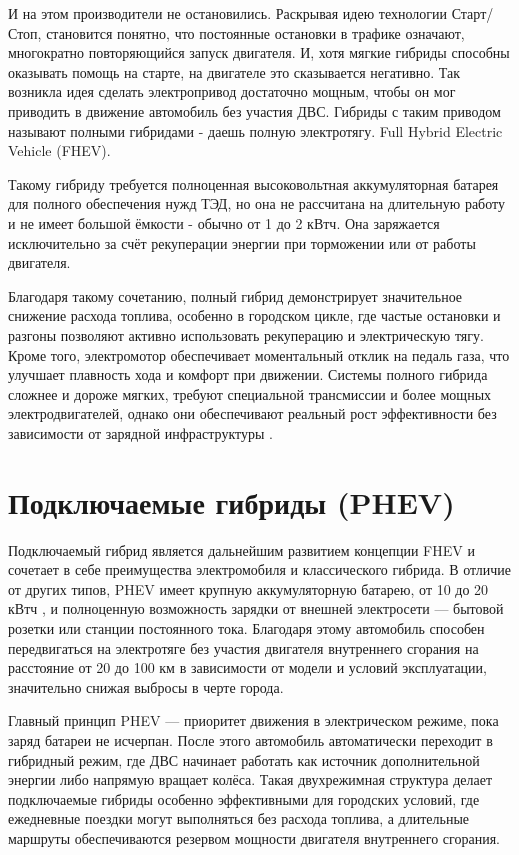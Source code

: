 И на этом производители не остановились. Раскрывая идею технологии Старт/Стоп, становится понятно, что постоянные остановки в трафике означают, многократно повторяющийся запуск двигателя. И, хотя мягкие гибриды способны оказывать помощь на старте, на двигателе это сказывается негативно. Так возникла идея сделать электропривод достаточно мощным, чтобы он мог приводить в движение автомобиль без участия ДВС. Гибриды с таким приводом называют полными гибридами - даешь полную электротягу. Full Hybrid Electric Vehicle (FHEV).

Такому гибриду требуется полноценная высоковольтная аккумуляторная батарея для полного обеспечения нужд ТЭД, но она не рассчитана на длительную работу и не имеет большой ёмкости - обычно от 1 до 2 кВтч. Она заряжается исключительно за счёт рекуперации энергии при торможении или от работы двигателя.

Благодаря такому сочетанию, полный гибрид демонстрирует значительное снижение расхода топлива, особенно в городском цикле, где частые остановки и разгоны позволяют активно использовать рекуперацию и электрическую тягу. Кроме того, электромотор обеспечивает моментальный отклик на педаль газа, что улучшает плавность хода и комфорт при движении. Системы полного гибрида сложнее и дороже мягких, требуют специальной трансмиссии и более мощных электродвигателей, однако они обеспечивают реальный рост эффективности без зависимости от зарядной инфраструктуры \cite{petrov}.

\section{Подключаемые гибриды (PHEV)}

Подключаемый гибрид является дальнейшим развитием концепции FHEV и сочетает в себе преимущества электромобиля и классического гибрида. В отличие от других типов, PHEV имеет крупную аккумуляторную батарею, от 10 до 20 кВтч \cite{Alexander}, и полноценную возможность зарядки от внешней электросети — бытовой розетки или станции постоянного тока. Благодаря этому автомобиль способен передвигаться на электротяге без участия двигателя внутреннего сгорания на расстояние от 20 до 100 км \cite{ICCT} в зависимости от модели и условий эксплуатации, значительно снижая выбросы в черте города.

\newpage

Главный принцип PHEV — приоритет движения в электрическом режиме, пока заряд батареи не исчерпан. После этого автомобиль автоматически переходит в гибридный режим, где ДВС начинает работать как источник дополнительной энергии либо напрямую вращает колёса. Такая двухрежимная структура делает подключаемые гибриды особенно эффективными для городских условий, где ежедневные поездки могут выполняться без расхода топлива, а длительные маршруты обеспечиваются резервом мощности двигателя внутреннего сгорания.

